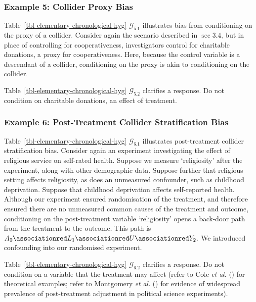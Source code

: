 \documentclass[
  single column]{article}
\begin{document}
\subsubsection{Example 5: Collider Proxy
Bias}\label{example-5-collider-proxy-bias}

Table~\ref{tbl-elementary-chronological-hyg} \(\mathcal{G}_{5.1}\)
illustrates bias from conditioning on the proxy of a collider. Consider
again the scenario described in \(\sec 3.4\), but in place of
controlling for cooperativeness, investigators control for charitable
donations, a proxy for cooperativeness. Here, because the control
variable is a descendant of a collider, conditioning on the proxy is
akin to conditioning on the collider.

Table~\ref{tbl-elementary-chronological-hyg} \(\mathcal{G}_{5.2}\)
clarifies a response. Do not condition on charitable donations, an
effect of treatment.

\subsubsection{Example 6: Post-Treatment Collider Stratification
Bias}\label{example-6-post-treatment-collider-stratification-bias}

Table~\ref{tbl-elementary-chronological-hyg} \(\mathcal{G}_{6.1}\)
illustrates post-treatment collider stratification bias. Consider again
an experiment investigating the effect of religious service on
self-rated health. Suppose we measure `religiosity' after the
experiment, along with other demographic data. Suppose further that
religious setting affects religiosity, as does an unmeasured confounder,
such as childhood deprivation. Suppose that childhood deprivation
affects self-reported health. Although our experiment ensured
randomisation of the treatment, and therefore ensured there are no
unmeasured common causes of the treatment and outcome, conditioning on
the post-treatment variable `religiosity' opens a back-door path from
the treatment to the outcome. This path is
\(A_0 \associationred L_1 \associationred U \associationred Y_2\). We
introduced confounding into our randomised experiment.

Table~\ref{tbl-elementary-chronological-hyg} \(\mathcal{G}_{6.2}\)
clarifies a response. Do not condition on a variable that the treatment
may affect (refer to Cole \emph{et al.} ()
for theoretical examples; refer to Montgomery \emph{et al.}
() for evidence of widespread
prevalence of post-treatment adjustment in political science
experiments).
\end{document}
